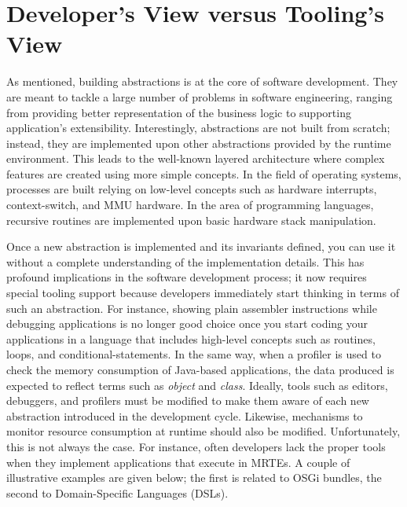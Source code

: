 \section{Developer's View versus Tooling's View} \label{sec:chapter2-introduction}

As mentioned, building abstractions is at the core of software development.
They are meant to tackle a large number of problems in software engineering, ranging from providing better representation of the business logic to supporting application's extensibility.
Interestingly, abstractions are not built from scratch; instead, they are implemented upon other abstractions provided by the runtime environment.
This leads to the well-known layered architecture where complex features are created using more simple concepts.
In the field of operating systems, processes are built relying on low-level concepts such as hardware interrupts, context-switch, and MMU hardware.
In the area of programming languages, recursive routines are implemented upon basic hardware stack manipulation.

Once a new abstraction is implemented and its invariants defined, you can use it without a complete understanding of the implementation details.
This has profound implications in the software development process; it now requires special tooling support because developers immediately start thinking in terms of such an abstraction.
For instance, showing plain assembler instructions while debugging applications is no longer good choice once you start coding your applications in a language that includes high-level concepts such as routines, loops, and conditional-statements.
In the same way, when a profiler is used to check the memory consumption of Java-based applications, the data produced is expected to reflect terms such as \textit{object} and \textit{class}.
Ideally, tools such as editors, debuggers, and profilers must be modified to make them aware of each new abstraction introduced in the development cycle.
Likewise, mechanisms to monitor resource consumption at runtime should also be modified.
Unfortunately, this is not always the case.
For instance, often developers lack the proper tools when they implement applications that execute in MRTEs.
A couple of illustrative examples are given below; the first is related to OSGi bundles, the second to Domain-Specific Languages (DSLs).

